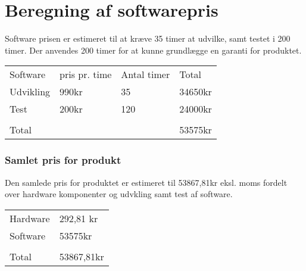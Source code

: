 \section{Beregning af softwarepris}
Software prisen er estimeret til at kræve 35 timer at udvilke, samt testet i 200 timer. Der anvendes 200 timer for at kunne grundlægge en garanti for produktet. 


\begin{tabular}{ |p{3cm}||p{3cm}|p{3cm}|p{3cm}|  }
 \hline
 \rowcolor{lightgray}\multicolumn{4}{|c|}{Pris beregning} \\
 \hline
 Software    & pris pr. time &Antal timer&Total\\
 \hline
 Udvikling   & 990kr    &35&   34650kr\\
 \hline
 Test&   200kr  & 120   &24000kr\\
 \hline
 		&	&	&\\
 \hline
 Total	&	&	&53575kr\\
 \hline 
\end{tabular}

\subsubsection{Samlet pris for produkt}

Den samlede pris for produktet er estimeret til 53867,81kr eksl. moms fordelt over hardware komponenter og udvkling samt test af software. 


\begin{tabular}{ |p{3cm}||p{3cm}|  }
 \hline
 \rowcolor{lightgray}\multicolumn{2}{|c|}{Pris beregning} \\
 \hline
 Hardware    & 292,81 kr \\
 \hline
 Software   & 53575kr   \\
 \hline

 		&		\\
 \hline
 Total	&	53867,81kr\\
 \hline 
\end{tabular}